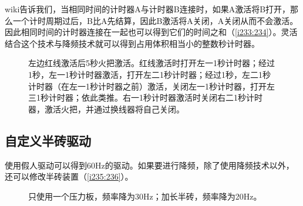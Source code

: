 wiki告诉我们，当相同时间的计时器A与计时器B连接时，如果A激活将B打开，那么一个计时周期过后，B比A先结算，因此B激活将A关闭，A关闭从而不会激活。因此相同时间的计时器连接在一起也可以得到它们的时间之和（\autoref{i233:234}）。灵活结合这个技术与降频技术就可以得到占用体积相当小的整数秒计时器。

\begin{figure}[!h]
\begin{center}
\qquad
{}
\end{center}
\caption{左边红线激活后5秒火把激活。红线激活时打开左一1秒计时器；经过1秒，左一1秒计时器激活，打开左二1秒计时器；经过1秒，左二1秒计时器（在左一1秒计时器之前）激活，关闭左一1秒计时器，打开左三1秒计时器；依此类推。右一1秒计时器激活时关闭右二1秒计时器，激活火把，并通过换线器将自己关闭。}
\label{i233:234}
\end{figure}

\subsection{自定义半砖驱动}
使用假人驱动可以得到60Hz的驱动。如果要进行降频，除了使用降频技术以外，还可以修改半砖装置（\autoref{i235:236}）。

\begin{figure}[!h]
\begin{center}
\qquad
{}
\end{center}
\caption{\protect{}只使用一个压力板，频率降为30Hz；\protect{}加长半砖，频率降为20Hz。}
\label{i235:236}
\end{figure}

